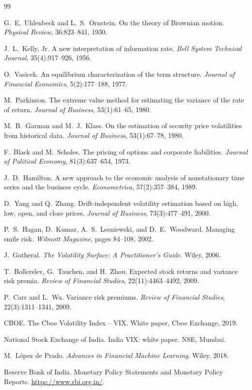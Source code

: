 \documentclass[11pt,a4paper]{article}
\begin{document}
\begin{thebibliography}{99}

G.~E.~Uhlenbeck and L.~S.~Ornstein.
\newblock On the theory of Brownian motion.
\newblock \emph{Physical Review}, 36:823--841, 1930.

J.~L.~Kelly, Jr.
\newblock A new interpretation of information rate.
\newblock \emph{Bell System Technical Journal}, 35(4):917--926, 1956.

O.~Vasicek.
\newblock An equilibrium characterization of the term structure.
\newblock \emph{Journal of Financial Economics}, 5(2):177--188, 1977.

M.~Parkinson.
\newblock The extreme value method for estimating the variance of the rate of return.
\newblock \emph{Journal of Business}, 53(1):61--65, 1980.

M.~B.~Garman and M.~J.~Klass.
\newblock On the estimation of security price volatilities from historical data.
\newblock \emph{Journal of Business}, 53(1):67--78, 1980.

F.~Black and M.~Scholes.
\newblock The pricing of options and corporate liabilities.
\newblock \emph{Journal of Political Economy}, 81(3):637--654, 1973.

J.~D.~Hamilton.
\newblock A new approach to the economic analysis of nonstationary time series and the business cycle.
\newblock \emph{Econometrica}, 57(2):357--384, 1989.

D.~Yang and Q.~Zhang.
\newblock Drift-independent volatility estimation based on high, low, open, and close prices.
\newblock \emph{Journal of Business}, 73(3):477--491, 2000.

P.~S.~Hagan, D.~Kumar, A.~S.~Lesniewski, and D.~E.~Woodward.
\newblock Managing smile risk.
\newblock \emph{Wilmott Magazine}, pages 84--108, 2002.

J.~Gatheral.
\newblock \emph{The Volatility Surface: A Practitioner's Guide}.
\newblock Wiley, 2006.

T.~Bollerslev, G.~Tauchen, and H.~Zhou.
\newblock Expected stock returns and variance risk premia.
\newblock \emph{Review of Financial Studies}, 22(11):4463--4492, 2009.

P.~Carr and L.~Wu.
\newblock Variance risk premiums.
\newblock \emph{Review of Financial Studies}, 22(3):1311--1341, 2009.

CBOE.
\newblock The Cboe Volatility Index -- VIX.
\newblock White paper, Cboe Exchange, 2019.

National Stock Exchange of India.
\newblock India VIX: white paper.
\newblock NSE, Mumbai.

M.~L\'opez de Prado.
\newblock \emph{Advances in Financial Machine Learning}.
\newblock Wiley, 2018.

Reserve Bank of India.
\newblock Monetary Policy Statements and Monetary Policy Reports.
\newblock \url{https://www.rbi.org.in/}.

\end{thebibliography}
\end{document}
